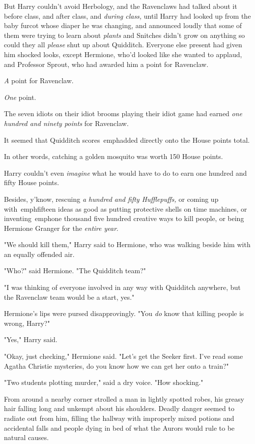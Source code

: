 But Harry couldn't avoid Herbology, and the Ravenclaws had talked about it 
before class, and after class, and \emph{during class,} until Harry had looked 
up from the baby furcot whose diaper he was changing, and announced loudly that 
some of them were trying to learn about \emph{plants} and Snitches didn't grow 
on anything so could they all \emph{please} shut up about Quidditch. Everyone 
else present had given him shocked looks, except Hermione, who'd looked like 
she wanted to applaud, and Professor Sprout, who had awarded him a point for 
Ravenclaw.

\emph{A} point for Ravenclaw.

\emph{One} point.

The seven idiots on their idiot brooms playing their idiot game had earned 
\emph{one hundred and ninety points} for Ravenclaw.

It seemed that Quidditch scores\ emph{added directly onto the House points 
total.}

In other words, catching a golden mosquito was worth 150 House points.

Harry couldn't even \emph{imagine} what he would have to do to earn one hundred 
and fifty House points.

Besides, y'know, rescuing \emph{a hundred and fifty Hufflepuffs,} or coming up 
with\ emph{fifteen ideas as good as putting protective shells on time 
machines,} or inventing\ emph{one thousand five hundred creative ways to kill 
people,} or being Hermione Granger for the \emph{entire year}.

"We should kill them," Harry said to Hermione, who was walking beside him with 
an equally offended air.

"Who?" said Hermione. "The Quidditch team?"

"I was thinking of everyone involved in any way with Quidditch anywhere, but 
the Ravenclaw team would be a start, yes."

Hermione's lips were pursed disapprovingly. "You \emph{do} know that killing 
people is wrong, Harry?"

"Yes," Harry said.

"Okay, just checking," Hermione said. "Let's get the Seeker first. I've read 
some Agatha Christie mysteries, do you know how we can get her onto a train?"

"Two students plotting murder," said a dry voice. "How shocking."

From around a nearby corner strolled a man in lightly spotted robes, his greasy 
hair falling long and unkempt about his shoulders. Deadly danger seemed to 
radiate out from him, filling the hallway with improperly mixed potions and 
accidental falls and people dying in bed of what the Aurors would rule to be 
natural causes.

